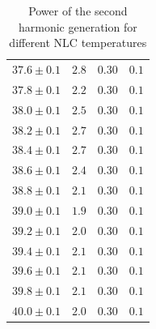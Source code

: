 \documentclass{protokoll_en}
\begin{document}
\begin{appendix}
\begin{table}[H]
\begin{floatrow}
{\begin{tabular}{lccc}
$37.6 \pm 0.1$ & $2.8$ & $0.30$ & $0.1$ \\
$37.8 \pm 0.1$ & $2.2$ & $0.30$ & $0.1$ \\
$38.0 \pm 0.1$ & $2.5$ & $0.30$ & $0.1$ \\
$38.2 \pm 0.1$ & $2.7$ & $0.30$ & $0.1$ \\
$38.4 \pm 0.1$ & $2.7$ & $0.30$ & $0.1$ \\
$38.6 \pm 0.1$ & $2.4$ & $0.30$ & $0.1$ \\
$38.8 \pm 0.1$ & $2.1$ & $0.30$ & $0.1$ \\
$39.0 \pm 0.1$ & $1.9$ & $0.30$ & $0.1$ \\
$39.2 \pm 0.1$ & $2.0$ & $0.30$ & $0.1$ \\
$39.4 \pm 0.1$ & $2.1$ & $0.30$ & $0.1$ \\
$39.6 \pm 0.1$ & $2.1$ & $0.30$ & $0.1$ \\
$39.8 \pm 0.1$ & $2.1$ & $0.30$ & $0.1$ \\
$40.0 \pm 0.1$ & $2.0$ & $0.30$ & $0.1$ \\
    \bottomrule
  \end{tabular}
}
\end{floatrow}
\caption{Power of the second harmonic generation for different NLC temperatures}
  \label{tab:ana_temp_dep}
\end{table}


\end{appendix}
\end{document}

